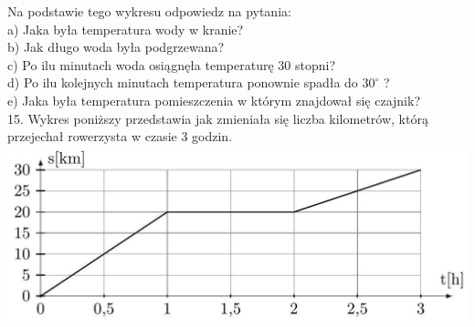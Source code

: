 \documentclass[10pt]{article}
\begin{document}
Na podstawie tego wykresu odpowiedz na pytania:\\
a) Jaka była temperatura wody w kranie?\\
b) Jak długo woda była podgrzewana?\\
c) Po ilu minutach woda osiągnęła temperaturę 30 stopni?\\
d) Po ilu kolejnych minutach temperatura ponownie spadła do \(30^{\circ}\) ?\\
e) Jaka była temperatura pomieszczenia w którym znajdował się czajnik?\\
15. Wykres poniższy przedstawia jak zmieniała się liczba kilometrów, którą przejechał rowerzysta w czasie 3 godzin.\\
\includegraphics[max width=\textwidth, center]{2024_11_21_8f01584889ff06348ae7g-073}
\end{document}
